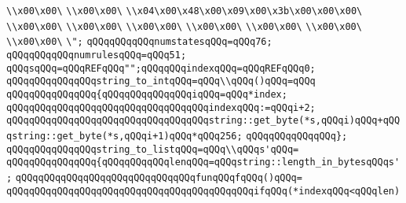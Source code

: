 \verb|\\x00\x00\|\newline
\verb|\\x00\x00\|\newline
\verb|\\x04\x00\x48\x00\x09\x00\x3b\x00\x00\x00\|\newline
\verb|\\x00\x00\|\newline
\verb|\\x00\x00\|\newline
\verb|\\x00\x00\|\newline
\verb|\\x00\x00\|\newline
\verb|\\x00\x00\|\newline
\verb|\\x00\x00\|\newline
\verb|\\x00\x00\|\newline
\verb|\";|\newline
\verb|qQQqqQQqqQQqnumstatesqQQq=qQQq76;|\newline
\verb|qQQqqQQqqQQqnumrulesqQQq=qQQq51;|\newline
\verb|qQQqsqQQq=qQQqREFqQQq"";qQQqqQQqindexqQQq=qQQqREFqQQq0;|\newline
\verb|qQQqqQQqqQQqqQQqstring_to_intqQQq=qQQq\\qQQq()qQQq=qQQq|\newline
\verb|qQQqqQQqqQQqqQQq{qQQqqQQqqQQqqQQqiqQQq=qQQq*index;|\newline
\verb|qQQqqQQqqQQqqQQqqQQqqQQqqQQqqQQqqQQqindexqQQq:=qQQqi+2;|\newline
\verb|qQQqqQQqqQQqqQQqqQQqqQQqqQQqqQQqqQQqstring::get_byte(*s,qQQqi)qQQq+qQQqstring::get_byte(*s,qQQqi+1)qQQq*qQQq256;|\newline
\verb|qQQqqQQqqQQqqQQq};|\newline
\newline
\verb|qQQqqQQqqQQqqQQqstring_to_listqQQq=qQQq\\qQQqs'qQQq=|\newline
\verb|qQQqqQQqqQQqqQQq{qQQqqQQqqQQqlenqQQq=qQQqstring::length_in_bytesqQQqs';|\newline
\verb|qQQqqQQqqQQqqQQqqQQqqQQqqQQqqQQqfunqQQqfqQQq()qQQq=|\newline
\verb|qQQqqQQqqQQqqQQqqQQqqQQqqQQqqQQqqQQqqQQqqQQqifqQQq(*indexqQQq<qQQqlen)|\newline
